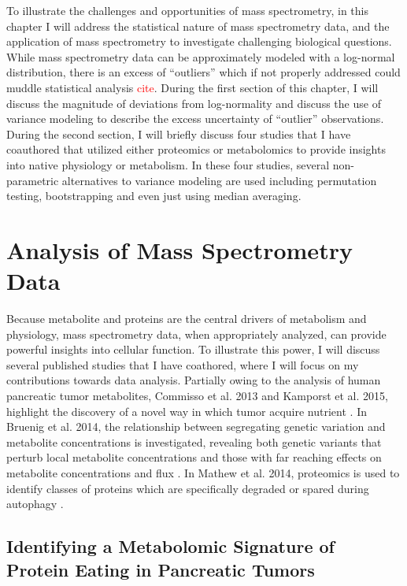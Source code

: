 To illustrate the challenges and opportunities of mass spectrometry, in this chapter I will address the statistical nature of mass spectrometry data, and the application of mass spectrometry to investigate challenging biological questions.  While mass spectrometry data can be approximately modeled with a log-normal distribution, there is an excess of ``outliers'' which if not properly addressed could muddle statistical analysis \textcolor{red}{cite}. During the first section of this chapter, I will discuss the magnitude of deviations from log-normality and discuss the use of variance modeling to describe the excess uncertainty of ``outlier'' observations.  During the second section, I will briefly discuss four studies that I have coauthored that utilized either proteomics or metabolomics to provide insights into native physiology or metabolism. In these four studies, several non-parametric alternatives to variance modeling are used including permutation testing, bootstrapping and even just using median averaging.




\section{Analysis of Mass Spectrometry Data}

Because metabolite and proteins are the central drivers of metabolism and physiology, mass spectrometry data, when appropriately analyzed, can provide powerful insights into cellular function.  To illustrate this power, I will discuss several published studies that I have coathored, where I will focus on my contributions towards data analysis. Partially owing to the analysis of human pancreatic tumor metabolites, Commisso et al. 2013 and Kamporst et al. 2015, highlight the discovery of a novel way in which tumor acquire nutrient \cite{Commisso:2013hz, Kamphorst:2015cc}.  In Bruenig et al. 2014, the relationship between segregating genetic variation and metabolite concentrations is investigated, revealing both genetic variants that perturb local metabolite concentrations and those with far reaching effects on metabolite concentrations and flux \cite{Breunig:2014bu}.  In Mathew et al. 2014, proteomics is used to identify classes of proteins which are specifically degraded or spared during autophagy \cite{Mathew:2014hz}.

\subsection{Identifying a Metabolomic Signature of Protein Eating in Pancreatic Tumors}


